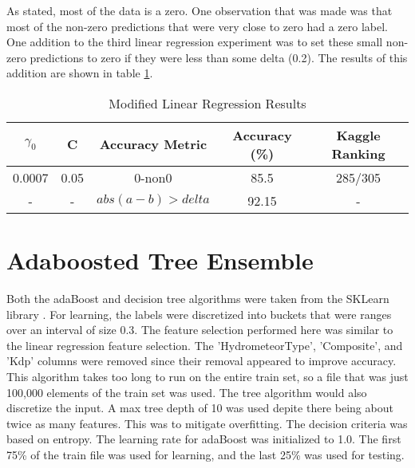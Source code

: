 \documentclass[pdftex,a4paper,12pt]{article}
\begin{document}
As stated, most of the data is a zero. One observation that was made was that most of the non-zero predictions that were very close to zero had a zero label. One addition to the third linear regression experiment was to set these small non-zero predictions to zero if they were less than some delta (0.2). The results of this addition are shown in table \ref{table:linAccModified}.
  \begin{table}[h]
        {\centering
          \begin{tabular}{|c|c|c|c|c|}
            \hline
             $\gamma_0$ & C & Accuracy Metric & Accuracy (\%) & Kaggle Ranking\\
            \hline
                0.0007 &   0.05        & 0-non0 & 85.5 & 285/305 \\
             \hline
                - &   -        & $abs(a - b) > delta$ & 92.15 & - \\
                  \hline
          \end{tabular}
          \caption{Modified Linear Regression Results}          
          \label{table:linAccModified}}
  \end{table}


\section{Adaboosted Tree Ensemble}
Both the adaBoost and decision tree algorithms were taken from the SKLearn library \cite{scikit-learn}. For learning, the labels were discretized into buckets that were ranges over an interval of size 0.3. The feature selection performed here was similar to the linear regression feature selection. The 'HydrometeorType', 'Composite', and 'Kdp' columns were removed since their removal appeared to improve accuracy. This algorithm takes too long to run on the entire train set, so a file that was just 100,000 elements of the train set was used. The tree algorithm would also discretize the input. A max tree depth of 10 was used depite there being about twice as many features. This was to mitigate overfitting. The decision criteria was based on entropy. The learning rate for adaBoost was initialized to 1.0. The first 75\% of the train file was used for learning, and the last 25\% was used for testing.
\end{document}
